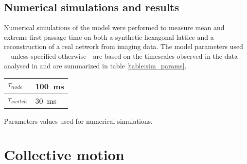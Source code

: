 \subsection{Numerical simulations and results}

Numerical simulations of the model were performed to measure mean and extreme first passage time on both a synthetic hexagonal lattice and a reconstruction of a real network from  imaging data. The model parameters used---unless specified otherwise---are based on the timescales observed in the  data analysed in  and are summarized in table \ref{table:sim_params}.


\begin{margintable}
  \sffamily
  \begin{tabular}{@{}ll@{}}
    $\tau_{node}$   & \SI{100}{\milli\second}  \\
    \hline
    $\tau_{switch}$ & \SI{30}{\milli\second}  \\
    \hline
  \end{tabular}
  \caption{Parameters values used for numerical simulations.}\label{table:sim_params}
\end{margintable}


\section{Collective motion}
